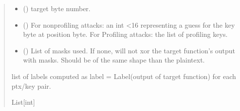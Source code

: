 \documentclass[letterpaper,10pt,english]{sphinxmanual}
\begin{document}
\begin{fulllineitems}
\begin{fulllineitems}
\begin{quote}
\begin{description}
\begin{itemize}
\item {} 
\sphinxAtStartPar
{} () \textendash{} target byte number.

\item {} 
\sphinxAtStartPar
{} (\sphinxstyleliteralemphasis{\sphinxupquote{,}}\sphinxstyleliteralemphasis{\sphinxupquote{{[}}}\sphinxstyleliteralemphasis{\sphinxupquote{{]}}}) \textendash{} For non\sphinxhyphen{}profiling attacks: an int \textless{}16 representing a guess for the key byte at position byte.
For Profiling attacks: the list of profiling keys.

\item {} 
\sphinxAtStartPar
{} (\sphinxstyleliteralemphasis{\sphinxupquote{{[}}}\sphinxstyleliteralemphasis{\sphinxupquote{{[}}}\sphinxstyleliteralemphasis{\sphinxupquote{{]}}}\sphinxstyleliteralemphasis{\sphinxupquote{{]}}}\sphinxstyleliteralemphasis{\sphinxupquote{, }}) \textendash{} List of masks used. If none, will not xor the target function’s output with masks.
Should be of the same shape than the plaintext.

\end{itemize}

\sphinxAtStartPar
list of labels computed as label = Label(output of target function) for each ptx/key pair.

\sphinxAtStartPar
List{[}int{]}

\end{description}\end{quote}

\end{fulllineitems}



\end{fulllineitems}
\end{document}
